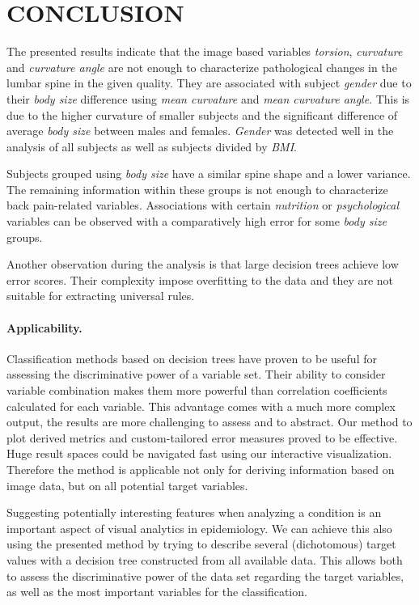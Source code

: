 \documentclass[a4paper,twoside]{style/article}
\begin{document}
\section{\uppercase{Conclusion}}
\label{sec:Conclusion}
\noindent The presented results indicate that the image based variables \emph{torsion}, \emph{curvature} and \emph{curvature angle} are not enough to characterize pathological changes in the lumbar spine in the given quality.
They are associated with subject \emph{gender} due to their \emph{body size} difference using \emph{mean curvature} and \emph{mean curvature angle}.
This is due to the higher curvature of smaller subjects and the significant difference of average \emph{body size} between males and females.
\emph{Gender} was detected well in the analysis of all subjects as well as subjects divided by \emph{BMI}.

Subjects grouped using \emph{body size} have a similar spine shape and a lower variance.
The remaining information within these groups is not enough to characterize back pain-related variables.
Associations with certain \emph{nutrition} or \emph{psychological} variables can be observed with a comparatively high error for some \emph{body size} groups.

Another observation during the analysis is that large decision trees achieve low error scores.
Their complexity impose overfitting to the data and they are not suitable for extracting universal rules.
\paragraph{Applicability.}
Classification methods based on decision trees have proven to be useful for assessing the discriminative power of a variable set.
Their ability to consider variable combination makes them more powerful than correlation coefficients calculated for each variable.
This advantage comes with a much more complex output, the results are more challenging to assess and to abstract.
Our method to plot derived metrics and custom-tailored error measures proved to be effective.
Huge result spaces could be navigated fast using our interactive visualization.
Therefore the method is applicable not only for deriving information based on image data, but on all potential target variables.

Suggesting potentially interesting features when analyzing a condition is an important aspect of visual analytics in epidemiology.
We can achieve this also using the presented method by trying to describe several (dichotomous) target values with a decision tree constructed from all available data.
This allows both to assess the discriminative power of the data set regarding the target variables, as well as the most important variables for the classification.
\end{document}
